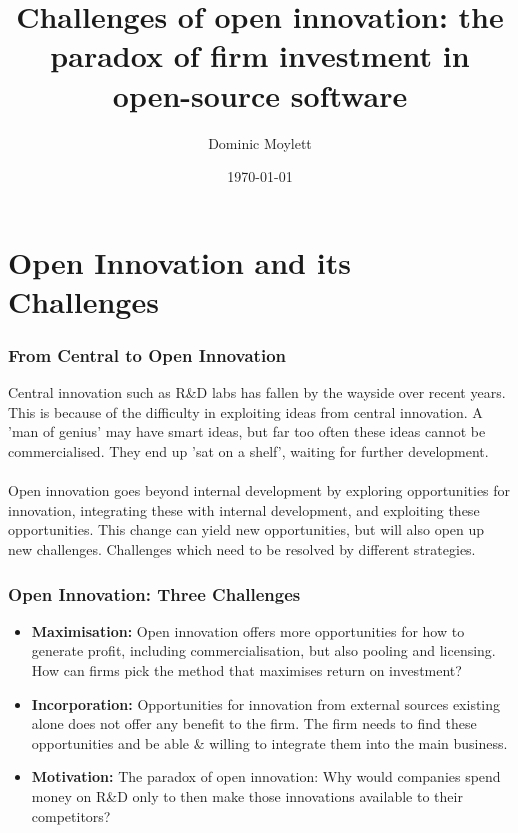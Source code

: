 \documentclass{beamer}
\title[Challenges of open innovation]{Challenges of open innovation: the paradox of firm investment in open-source software} %
\author{Dominic Moylett} %
\institute[University of Bristol] %
{
University of Bristol \\ %
\medskip
\textit{dominic.moylett.2011@my.bristol.ac.uk} %
}
\date{\today} %
\begin{document}
\begin{frame}
\titlepage %
\end{frame}


\section{Open Innovation and its Challenges}

\begin{frame}
\frametitle{From Central to Open Innovation}
Central innovation such as R\&D labs has fallen by the wayside over recent years. This is because of the difficulty in exploiting ideas from central innovation. A 'man of genius' may have smart ideas, but far too often these ideas cannot be commercialised. They end up 'sat on a shelf', waiting for further development.\\~\\

Open innovation goes beyond internal development by exploring opportunities for innovation, integrating these with internal development, and exploiting these opportunities. This change can yield new opportunities, but will also open up new challenges. Challenges which need to be resolved by different strategies.
\end{frame}


\begin{frame}
\frametitle{Open Innovation: Three Challenges}
\begin{itemize}
\item \textbf{Maximisation:} Open innovation offers more opportunities for how to generate profit, including commercialisation, but also pooling and licensing. How can firms pick the method that maximises return on investment?
\item \textbf{Incorporation:} Opportunities for innovation from external sources existing alone does not offer any benefit to the firm. The firm needs to find these opportunities and be able \& willing to integrate them into the main business.
\item \textbf{Motivation:} The paradox of open innovation: Why would companies spend money on R\&D only to then make those innovations available to their competitors?
\end{itemize}
\end{frame}
\end{document}
